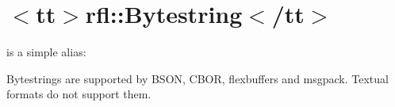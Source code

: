 \chapter{\texorpdfstring{$<$}{<}tt\texorpdfstring{$>$}{>}rfl\+::Bytestring\texorpdfstring{$<$}{<}/tt\texorpdfstring{$>$}{>}}
\hypertarget{md_external_2reflect-cpp_2docs_2bytestring}{}\label{md_external_2reflect-cpp_2docs_2bytestring}
\label{md_external_2reflect-cpp_2docs_2bytestring_autotoc_md527}%
%


{\ttfamily {}} is a simple alias\+:


\begin{DoxyCode}{0}
\DoxyCodeLine{}
\DoxyCodeLine{}
\DoxyCodeLine{\}}

\end{DoxyCode}


Bytestrings are supported by BSON, CBOR, flexbuffers and msgpack. Textual formats do not support them. 